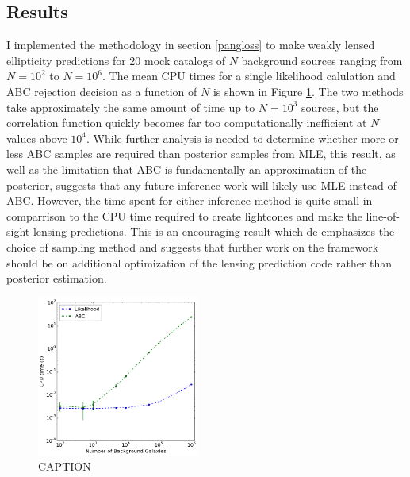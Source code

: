 \documentclass[%
 reprint,
 amsmath,amssymb,
 aps,nofootinbib
]{revtex4-1}
\begin{document}
\subsection{Results} \label{inference_results}

I implemented the methodology in section \ref{pangloss} to make weakly lensed ellipticity predictions for 20 mock catalogs of $N$ background sources ranging from $N=10^2$ to $N=10^6$. The mean CPU times for a single likelihood calulation and ABC rejection decision as a function of $N$ is shown in Figure \ref{fig:mle_vs_abc}. The two methods take approximately the same amount of time up to $N=10^3$ sources, but the correlation function quickly becomes far too computationally inefficient at $N$ values above $10^4$. While further analysis is needed to determine whether more or less ABC samples are required than posterior samples from MLE, this result, as well as the limitation that ABC is fundamentally an approximation of the posterior,
suggests that any future inference work will likely use MLE instead of ABC. However, the time spent for either inference method is quite small in comparrison to the CPU time required to create lightcones and make the line-of-sight lensing predictions. This is an encouraging result which de-emphasizes the choice of sampling method and suggests that further work on the framework should be on additional optimization of the lensing prediction code rather than posterior estimation.

\begin{figure}
    \centering
    \includegraphics[width=0.475\textwidth]{figs-swe/thesis/mle_vs_abc.png}
    \captionsetup{justification=raggedright,singlelinecheck=false}
    \caption{CAPTION}
    \label{fig:mle_vs_abc}
\end{figure}
\end{document}
